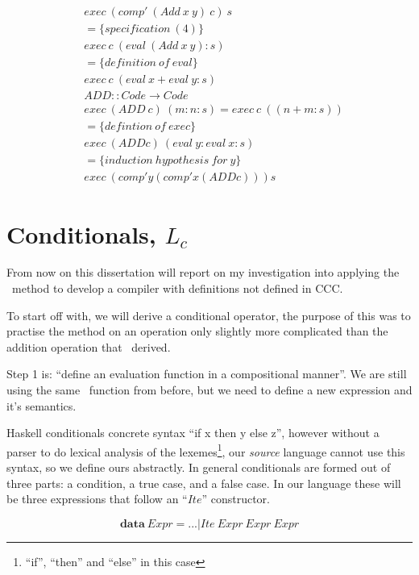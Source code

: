 \documentclass {article}
\begin{document}
\begin{align*}
	&exec \ (comp' \ (Add \ x \ y) \ c) \ s \\
	&= \{specification \ (4) \} \\
	&exec \ c \ (eval \ (Add \ x \ y) : s) \\
	&= \{definition \ of \ eval\} \\
	&exec \ c \ (eval \ x + eval \ y :s) \\
	&ADD :: Code \rightarrow Code \\
	&exec \ (ADD \ c) \ (m:n:s) = exec \ c \ ((n+m:s)) \\
	&= \{ defintion \ of \ exec \} \\
	&exec \ (ADD c) \ (eval \ y : eval \ x : s) \\
	&= \{ induction \ hypothesis \ for \ y \} \\
	&exec \ (comp' y (comp' x (ADD c))) s
\end{align*}


\section{Conditionals, $L_c$}

From now on this dissertation will report on my
investigation into applying the \BH\ method to develop a compiler
with definitions not defined in CCC.

To start off with, we will derive a conditional operator,
the purpose of this was to practise the method
on an operation only slightly more complicated than
the addition operation that \BH\ derived.

\newcommand{\ite}{$Ite$}

Step 1 is: 
``define an evaluation function in a compositional manner''.
We are still using the same \eval\ function from before,
but we need to define a new 
expression and it's semantics.

Haskell conditionals concrete
syntax ``if  x then y else z'',
however without a parser to do
lexical analysis\cite[chapter 2.2]{dragon} of the lexemes\footnote{
``if'', ``then'' and ``else'' in this case},
our \emph{source} language cannot use this
syntax, so we define ours abstractly.
In general conditionals are formed out of three parts:
a condition, a true case, and a false case.
In our language these will be three expressions
that follow an ``\ite'' constructor.

	\[ \textbf{data} \ Expr = ... | Ite \ Expr \ Expr \ Expr \]
\end{document}
